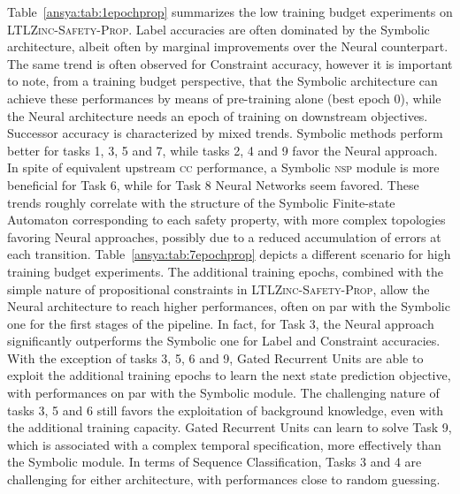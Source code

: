 Table~\ref{ansya:tab:1epochprop} summarizes the low training budget experiments on \textsc{LTLZinc-Safety-Prop}. 
Label accuracies are often dominated by the Symbolic architecture, albeit often by marginal improvements over the Neural counterpart. The same trend is often observed for Constraint accuracy, however it is important to note, from a training budget perspective, that the Symbolic architecture can achieve these performances by means of pre-training alone (best epoch 0), while the Neural architecture needs an epoch of training on downstream objectives.
Successor accuracy is characterized by mixed trends. Symbolic methods perform better for tasks 1, 3, 5 and 7, while tasks 2, 4 and 9 favor the Neural approach. 
In spite of equivalent upstream \textsc{cc} performance, a Symbolic \textsc{nsp} module is more beneficial for Task 6, while for Task 8 Neural Networks seem favored. These trends roughly correlate with the structure of the Symbolic Finite-state Automaton corresponding to each safety property, with more complex topologies favoring Neural approaches, possibly due to a reduced accumulation of errors at each transition.
%
Table~\ref{ansya:tab:7epochprop} depicts a different scenario for high training budget experiments. The additional training epochs, combined with the simple nature of propositional constraints in \textsc{LTLZinc-Safety-Prop}, allow the Neural architecture to reach higher performances, often on par with the Symbolic one for the first stages of the pipeline. In fact, for Task 3, the Neural approach significantly outperforms the Symbolic one for Label and Constraint accuracies.
With the exception of tasks 3, 5, 6 and 9, Gated Recurrent Units are able to exploit the additional training epochs to learn the next state prediction objective, with performances on par with the Symbolic module.
The challenging nature of tasks 3, 5 and 6 still favors the exploitation of background knowledge, even with the additional training capacity. Gated Recurrent Units can learn to solve Task 9, which is associated with a complex temporal specification, more effectively than the Symbolic module.
In terms of Sequence Classification, Tasks 3 and 4 are challenging for either architecture, with performances close to random guessing.

